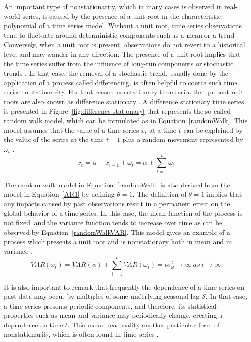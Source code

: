 \documentclass[11pt]{dippg}
\begin{document}
An important type of nonstationarity, which in many cases is observed in real-world series, is caused by the presence of a unit root in the characteristic polynomial of a time series model. Without a unit root, time series observations tend to fluctuate around deterministic components such as a mean or a trend. Conversely, when a unit root is present, observations do not revert to a historical level and may wander in any direction. The presence of a unit root implies that the time series suffer from the influence of long-run components or stochastic trends \cite{hanssens_market_2003}. In that case, the removal of a stochastic trend, usually done by the application of a process called differencing, is often helpful to coerce such time series to stationarity. For that reason nonstationary time series that present unit roots are also known as difference stationary \cite{box_time_2008}. A difference stationary time series is presented in Figure~\ref{fig:difference-stationary} that represents the so-called random walk model, which can be formulated as in Equation~\ref{randomWalk}. This model assumes that the value of a time series $x_t$ at a time $t$ can be explained by the value of the series at the time $t - 1$ plus a random movement represented by $\omega_t$ \cite{shumway_time_2017}.
\begin{equation}\label{randomWalk}
x_t = \alpha + x_{t-1} + \omega_t = \alpha + \sum^{t}_{i=1}{\omega_i}
\end{equation}

The random walk model in Equation~\ref{randomWalk} is also derived from the  model in Equation~\ref{AR1} by defining $\theta = 1$. The definition of $\theta = 1$ implies that any impacts caused by past observations result in a permanent effect on the global behavior of a time series. In this case, the mean function of the process is not fixed, and the variance function tends to increase over time \cite{hanssens_market_2003} as can be observed by Equation~\ref{randomWalkVAR}. This model gives an example of a process which presents a unit root and is nonstationary both in mean and in variance \cite{yang_nonstationarity_2010}.
\begin{equation}\label{randomWalkVAR}
VAR(x_t) = VAR(\alpha) + \sum^{t}_{i=1}{VAR(\omega_i)} = t\sigma^2_\omega \rightarrow \infty \ as \ t \rightarrow \infty
\end{equation}

It is also important to remark that frequently the dependence of a time series on past data may occur by multiples of some underlying seasonal lag $S$. In that case, a time series presents periodic components, and therefore, its statistical properties such as mean and variance may periodically change, creating a dependence on time $t$. This makes seasonality another particular form of nonstationarity, which is often found in time series \cite{yang_nonstationarity_2010}.
\end{document}
